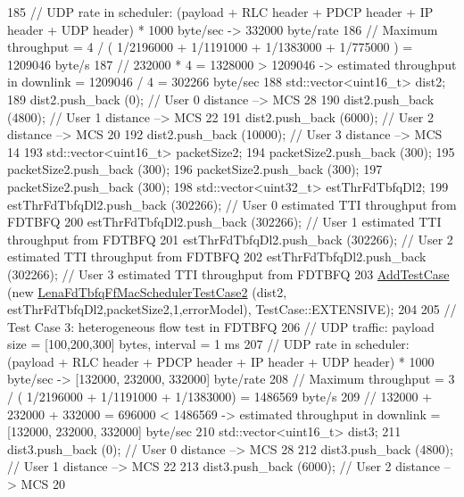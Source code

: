 \begin{DoxyCode}
185   \textcolor{comment}{//   UDP rate in scheduler: (payload + RLC header + PDCP header + IP header + UDP header) * 1000 byte/sec
       -> 332000 byte/rate}
186   \textcolor{comment}{// Maximum throughput = 4 / ( 1/2196000 + 1/1191000 + 1/1383000 + 1/775000 ) = 1209046 byte/s}
187   \textcolor{comment}{// 232000 * 4 = 1328000 > 1209046 -> estimated throughput in downlink = 1209046 / 4 = 302266 byte/sec}
188   std::vector<uint16\_t> dist2;
189   dist2.push\_back (0);       \textcolor{comment}{// User 0 distance --> MCS 28}
190   dist2.push\_back (4800);    \textcolor{comment}{// User 1 distance --> MCS 22}
191   dist2.push\_back (6000);    \textcolor{comment}{// User 2 distance --> MCS 20}
192   dist2.push\_back (10000);   \textcolor{comment}{// User 3 distance --> MCS 14}
193   std::vector<uint16\_t> packetSize2;
194   packetSize2.push\_back (300);
195   packetSize2.push\_back (300);
196   packetSize2.push\_back (300);
197   packetSize2.push\_back (300);
198   std::vector<uint32\_t> estThrFdTbfqDl2;
199   estThrFdTbfqDl2.push\_back (302266); \textcolor{comment}{// User 0 estimated TTI throughput from FDTBFQ}
200   estThrFdTbfqDl2.push\_back (302266); \textcolor{comment}{// User 1 estimated TTI throughput from FDTBFQ}
201   estThrFdTbfqDl2.push\_back (302266); \textcolor{comment}{// User 2 estimated TTI throughput from FDTBFQ}
202   estThrFdTbfqDl2.push\_back (302266); \textcolor{comment}{// User 3 estimated TTI throughput from FDTBFQ}
203   \hyperlink{classns3_1_1TestCase_a3718088e3eefd5d6454569d2e0ddd835}{AddTestCase} (\textcolor{keyword}{new} \hyperlink{classLenaFdTbfqFfMacSchedulerTestCase2}{LenaFdTbfqFfMacSchedulerTestCase2} (dist2,
      estThrFdTbfqDl2,packetSize2,1,errorModel), TestCase::EXTENSIVE);
204 
205   \textcolor{comment}{// Test Case 3: heterogeneous flow test in FDTBFQ}
206   \textcolor{comment}{//   UDP traffic: payload size = [100,200,300] bytes, interval = 1 ms}
207   \textcolor{comment}{//   UDP rate in scheduler: (payload + RLC header + PDCP header + IP header + UDP header) * 1000 byte/sec
       -> [132000, 232000, 332000] byte/rate }
208   \textcolor{comment}{// Maximum throughput = 3 / ( 1/2196000 + 1/1191000 + 1/1383000) = 1486569 byte/s}
209   \textcolor{comment}{// 132000 + 232000 + 332000 = 696000 < 1486569 -> estimated throughput in downlink = [132000, 232000,
       332000] byte/sec}
210   std::vector<uint16\_t> dist3;
211   dist3.push\_back (0);    \textcolor{comment}{// User 0 distance --> MCS 28}
212   dist3.push\_back (4800);    \textcolor{comment}{// User 1 distance --> MCS 22}
213   dist3.push\_back (6000);    \textcolor{comment}{// User 2 distance --> MCS 20}

\end{DoxyCode}
